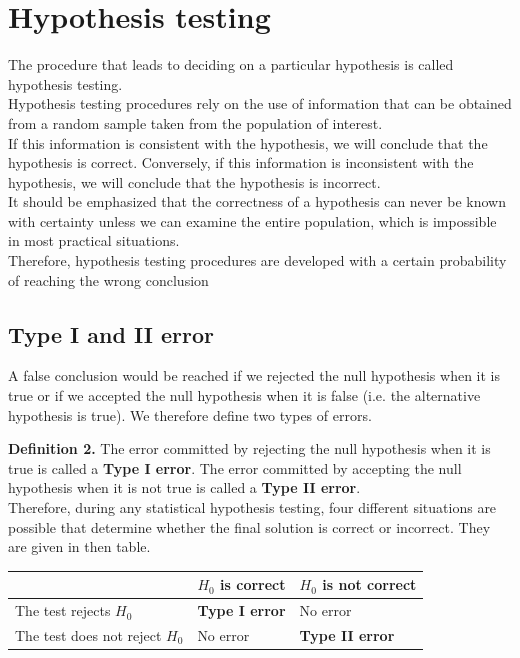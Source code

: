 \documentclass[a4paper, 12pt]{article}
\begin{document}
\section{Hypothesis testing}

The procedure that leads to deciding on a particular hypothesis is called hypothesis testing.\\

Hypothesis testing procedures rely on the use of information that can be obtained from a random sample taken from the population of interest.\\

If this information is consistent with the hypothesis, we will conclude that the hypothesis is correct. Conversely, if this information is inconsistent with the hypothesis, we will conclude that the hypothesis is incorrect.\\

It should be emphasized that the correctness of a hypothesis can never be known with certainty unless we can examine the entire population, which is impossible in most practical situations.\\

Therefore, hypothesis testing procedures are developed with a certain probability of reaching the wrong conclusion\\

\subsection{Type I and II error}

A false conclusion would be reached if we rejected the null hypothesis when it is true or if we accepted the null hypothesis when it is false (i.e. the alternative hypothesis is true). We therefore define two types of errors.


\textbf{Definition 2.} The error committed by rejecting the null hypothesis when it is true is called a \textbf{Type I error}. The error committed by accepting the null hypothesis when it is not true is called a \textbf{Type II error}.\\

Therefore, during any statistical hypothesis testing, four different situations are possible that determine whether the final solution is correct or incorrect. They are given in then table.

\begin{table}[h!]
\centering
\begin{tabular}{|l|l|l|}
\hline
\textit{}                      & $H_0$ is correct      & $H_0$ is not correct   \\ \hline
The test rejects $H_0$         & \textbf{Type I error} & No error               \\ \hline
The test does not reject $H_0$ & No error              & \textbf{Type II error} \\ \hline
\end{tabular}
\end{table}
\end{document}
